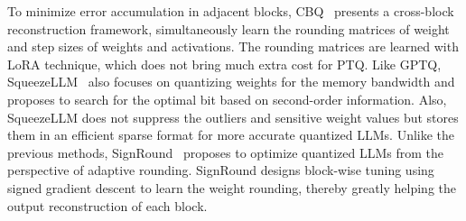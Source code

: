 \documentclass[10pt,journal,compsoc]{IEEEtran}
\newcommand{\<}{\left\langle}
\renewcommand{\>}{\right\rangle}
\newcommand{\1}{\mathbbm{1}}
\begin{document}
\begin{CJK}{UTF8}{gbsn}
To minimize error accumulation in adjacent blocks, CBQ~\cite{ding2023cbq} presents a cross-block reconstruction framework, 
simultaneously learn the rounding matrices of weight and step sizes of weights and activations. The rounding matrices are learned with LoRA technique, which does not bring much extra cost for PTQ. 
Like GPTQ, SqueezeLLM~\cite{kim2023squeezellm} also focuses on quantizing weights for the memory bandwidth and proposes to search for the optimal bit based on second-order information. Also, SqueezeLLM does not suppress the outliers and sensitive weight values but stores them in an efficient sparse format for more accurate quantized LLMs. Unlike the previous methods, SignRound~\cite{cheng2023optimize} proposes to optimize quantized LLMs from the perspective of adaptive rounding. SignRound designs block-wise tuning using signed gradient descent to learn the weight rounding, thereby greatly helping the output reconstruction of each block.
\begin{table}[t]
		\centering
		\caption{Perplexity (PPL) comparison of different quantization methods on WikiText2. W/E denotes weights and embedding, respectively. * represents adopting different methods to get the perplexity, please refer to the corresponding papers.}
		\label{Quant4LLM}
		\vspace{-2mm}
		\setlength{\tabcolsep}{3pt}
\end{table}
\end{CJK}
\end{document}
